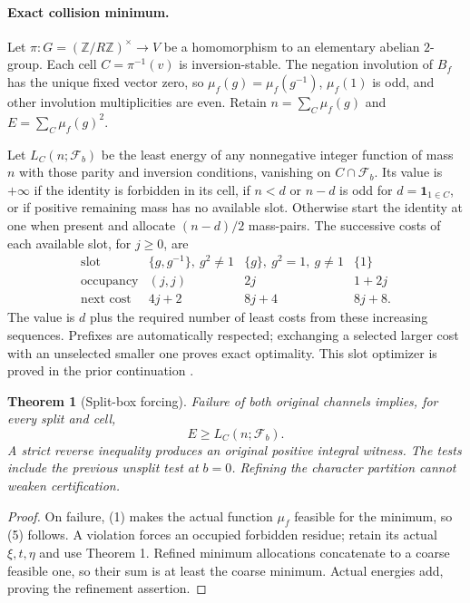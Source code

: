 \documentclass[10pt,a4paper]{article}
\newtheorem{theorem}{Theorem}
\begin{document}
\paragraph{Exact collision minimum.}
Let $\pi:G=(\mathbb Z/R\mathbb Z)^\times\to V$ be a homomorphism to an
 elementary abelian $2$-group. Each cell $C=\pi^{-1}(v)$ is inversion-stable.
The negation involution of $B_f$ has the unique fixed vector zero, so
$\mu_f(g)=\mu_f(g^{-1})$, $\mu_f(1)$ is odd, and other involution
multiplicities are even. Retain $n=\sum_C\mu_f(g)$ and $E=\sum_C\mu_f(g)^2$.

Let $L_C(n;\mathcal F_b)$ be the least energy of any nonnegative integer
function of mass $n$ with those parity and inversion conditions, vanishing
on $C\cap\mathcal F_b$. Its value is $+\infty$ if the identity is
forbidden in its cell, if $n<d$ or $n-d$ is odd for $d=\mathbf1_{1\in C}$,
or if positive remaining mass has no available slot. Otherwise start the
identity at one when present and allocate $(n-d)/2$ mass-pairs. The successive
costs of each available slot, for $j\ge0$, are
\[
 \begin{array}{c|ccc}
 \text{slot}&\{g,g^{-1}\},\ g^2\ne1&\{g\},\ g^2=1,\ g\ne1&\{1\}\\\hline
 \text{occupancy}&(j,j)&2j&1+2j\\
 \text{next cost}&4j+2&8j+4&8j+8.
 \end{array}                                                   \tag{4}
\]
The value is $d$ plus the required number of least costs from these
increasing sequences. Prefixes are automatically respected; exchanging a
selected larger cost with an unselected smaller one proves exact optimality.
This slot optimizer is proved in the prior continuation \cite{Prior}.

\begin{theorem}[Split-box forcing]
Failure of both original channels implies, for every split and cell,
\[
 \boxed{E\ge L_C(n;\mathcal F_b).}                             \tag{5}
\]
A strict reverse inequality produces an original positive integral witness.
The tests include the previous unsplit test at $b=0$. Refining the character
partition cannot weaken certification.
\end{theorem}
\begin{proof}
On failure, (1) makes the actual function $\mu_f$ feasible for the minimum,
so (5) follows. A violation forces an occupied forbidden residue; retain
its actual $\xi,t,\eta$ and use Theorem 1. Refined minimum allocations
concatenate to a coarse feasible one, so their sum is at least the coarse
minimum. Actual energies add, proving the refinement assertion.
\end{proof}
\end{document}
